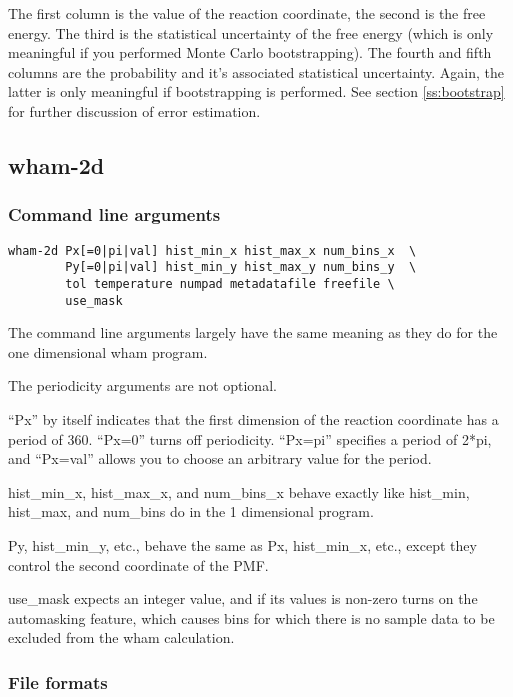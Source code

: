 \documentclass[12pt]{article}
\begin{document}
The first column is the value of the reaction coordinate, the second is the
free energy.  The third is the statistical uncertainty of the free energy
(which is only meaningful if you performed Monte Carlo bootstrapping).  The
fourth and fifth columns are the probability and it's associated
statistical uncertainty.  Again, the latter is only meaningful if
bootstrapping is performed.  See section \ref{ss:bootstrap} for further
discussion of error estimation.

\subsection{wham-2d}

\subsubsection{Command line arguments}

\begin{verbatim}
wham-2d Px[=0|pi|val] hist_min_x hist_max_x num_bins_x  \
        Py[=0|pi|val] hist_min_y hist_max_y num_bins_y  \
        tol temperature numpad metadatafile freefile \ 
        use_mask
\end{verbatim}

The command line arguments largely have the same meaning as they do for the
one dimensional wham program.

The periodicity arguments are not optional.

``Px'' by itself indicates that the first dimension of the reaction coordinate
has a period of 360.  ``Px=0'' turns off periodicity.  ``Px=pi'' specifies a
period of 2*pi, and ``Px=val'' allows you to choose an arbitrary value for
the period.

hist\_min\_x, hist\_max\_x, and num\_bins\_x behave exactly like hist\_min,
hist\_max, and num\_bins do in the 1 dimensional program.

Py, hist\_min\_y, etc., behave the same as Px, hist\_min\_x, etc., except they
control the second coordinate of the PMF.

use\_mask expects an integer value, and if its values is non-zero turns on
the automasking feature, which causes bins for which there is no sample data
to be excluded from the wham calculation.

\subsubsection{File formats}
\end{document}
